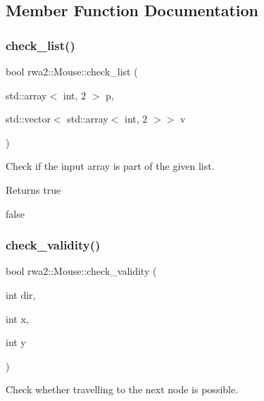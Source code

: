 \subsection{Member Function Documentation}
\mbox{\label{classrwa2_1_1_mouse_a760964c393cf8861429d2e02aba4f033}} 
\subsubsection{\texorpdfstring{check\+\_\+list()}{check\_list()}}
{\footnotesize\ttfamily bool rwa2\+::\+Mouse\+::check\+\_\+list (\begin{DoxyParamCaption}\item[{std\+::array$<$ int, 2 $>$}]{p,  }\item[{std\+::vector$<$ std\+::array$<$ int, 2 $>$$>$}]{v }\end{DoxyParamCaption})}



Check if the input array is part of the given list. 

\begin{DoxyReturn}{Returns}
true 

false 
\end{DoxyReturn}
\mbox{\label{classrwa2_1_1_mouse_a35873f1fd775399f6506a1da415a8da9}} 
\subsubsection{\texorpdfstring{check\+\_\+validity()}{check\_validity()}}
{\footnotesize\ttfamily bool rwa2\+::\+Mouse\+::check\+\_\+validity (\begin{DoxyParamCaption}\item[{int}]{dir,  }\item[{int}]{x,  }\item[{int}]{y }\end{DoxyParamCaption})}



Check whether travelling to the next node is possible. 

